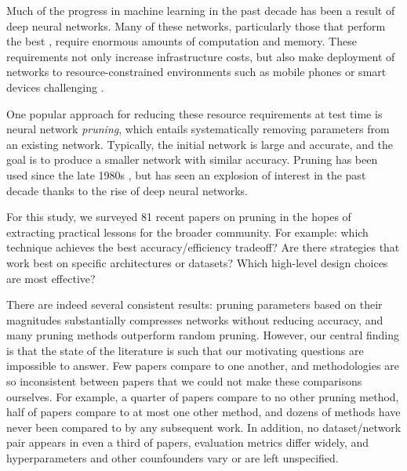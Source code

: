 

Much of the progress in machine learning in the past decade has been a result of deep neural networks. Many of these networks, particularly those that perform the best \cite{gpipe}, require enormous amounts of computation and memory. These requirements not only increase infrastructure costs, but also make deployment of networks to resource-constrained environments such as mobile phones or smart devices challenging \cite{learning-both, szeEfficient, sze-energy-aware}.

One popular approach for reducing these resource requirements at test time is neural network \textit{pruning}, which entails systematically removing parameters from an existing network. Typically, the initial network is large and accurate, and the goal is to produce a smaller network with similar accuracy. Pruning has been used since the late 1980s \cite{janowsky_pruning_1989, mozer_skeletonization:_1989, mozer_using_1989, karnin_simple_1990}, but has seen an explosion of interest in the past decade thanks to the rise of deep neural networks.

For this study, we surveyed 81 recent papers on pruning in the hopes of extracting practical lessons for the broader community.
For example: which technique achieves the best accuracy/efficiency tradeoff?
Are there strategies that work best on specific architectures or datasets?
Which high-level design choices are most effective?

There are indeed several consistent results: pruning parameters based on their magnitudes substantially compresses networks without reducing accuracy, and many pruning methods outperform random pruning.
However, our central finding is that the state of the literature is such that our motivating questions are impossible to answer.
Few papers compare to one another, and methodologies are so inconsistent between papers that we could not make these comparisons ourselves.
For example, a quarter of papers compare to no other pruning method, half of papers compare to at most one other method, and
dozens of methods have never been compared to by any subsequent work.
In addition, no dataset/network pair appears in even a third of papers, evaluation metrics differ widely, and hyperparameters and other counfounders vary or are left unspecified.



